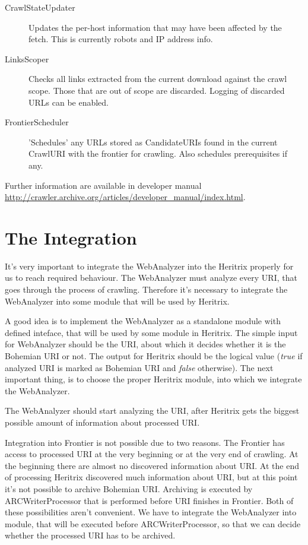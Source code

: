 \documentclass[11pt,a4paper]{article}
\begin{document}
\begin{description}
\item[CrawlStateUpdater] Updates the per-host information that may have been affected by the fetch. This is currently robots and IP address info.
\item[LinksScoper] Checks all links extracted from the current download against the crawl scope. Those that are out of scope are discarded. Logging of discarded URLs can be enabled.
\item[FrontierScheduler] 'Schedules' any URLs stored as CandidateURIs found in the current CrawlURI with the frontier for crawling. Also schedules prerequisites if any.
\end{description}

Further information are available in developer manual \url{http://crawler.archive.org/articles/developer_manual/index.html}.


\newpage
\section{The Integration}

It's very important to integrate the WebAnalyzer into the Heritrix properly for us to reach required behaviour. The WebAnalyzer must analyze every URI, that goes through the process of crawling. Therefore it's necessary to integrate the WebAnalyzer into some module that will be used by Heritrix.

A good idea is to implement the WebAnalyzer as a standalone module with defined inteface, that will be used by some module in Heritrix. The simple input for WebAnalyzer should be the URI, about which it decides whether it is the Bohemian URI or not. The output for Heritrix should be the logical value (\emph{true} if analyzed URI is marked as Bohemian URI and \emph{false} otherwise). The next important thing, is to choose the proper Heritrix module, into which we integrate the WebAnalyzer.

The WebAnalyzer should start analyzing the URI, after Heritrix gets the biggest possible amount of information about processed URI.

Integration into Frontier is not possible due to two reasons. The Frontier has access to processed URI at the very beginning or at the very end of crawling. At the beginning there are almost no discovered information about URI. At the end of processing Heritrix discovered much information about URI, but at this point it's not possible to archive Bohemian URI. Archiving is executed by ARCWriterProcessor that is performed before URI finishes in Frontier. Both of these possibilities aren't convenient. We have to integrate the WebAnalyzer into module, that will be executed before \mbox{ARCWriterProcessor}, so that we can decide whether the processed URI has to be archived.
\end{document}
